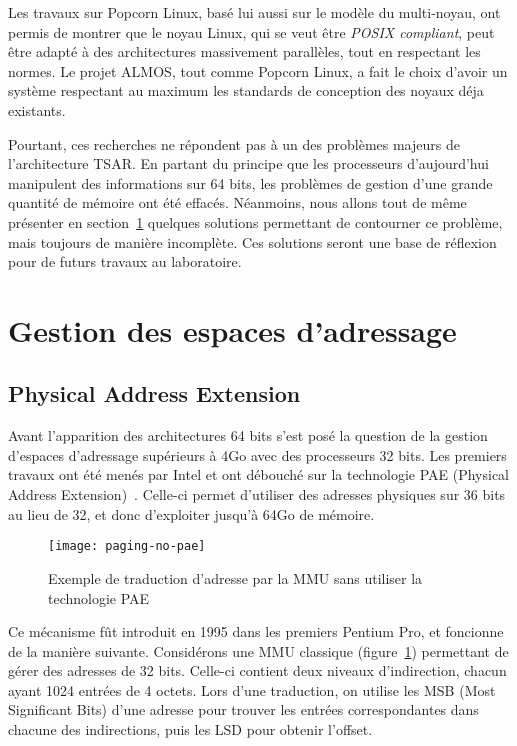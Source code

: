       Les travaux sur Popcorn Linux, basé lui aussi sur le modèle du
      multi-noyau, ont permis de montrer que le noyau Linux, qui se veut être
      \textit{POSIX compliant}, peut être adapté à des architectures massivement
      parallèles, tout en respectant les normes. Le projet ALMOS, tout comme
      Popcorn Linux, a fait le choix d'avoir un système respectant au maximum
      les standards de conception des noyaux déja existants.

      Pourtant, ces recherches ne répondent pas à un des problèmes majeurs de
      l'architecture TSAR. En partant du principe que les processeurs
      d'aujourd'hui manipulent des informations sur 64 bits, les problèmes de
      gestion d'une grande quantité de mémoire ont été effacés. Néanmoins, nous
      allons tout de même présenter en section~\ref{sec:memory} quelques
      solutions permettant de contourner ce problème, mais toujours de manière
      incomplète. Ces solutions seront une base de réflexion pour de futurs
      travaux au laboratoire.
    
     

  \section{Gestion des espaces d'adressage}
  \label{sec:memory}    

    \subsection{Physical Address Extension}

      Avant l'apparition des architectures 64 bits s'est posé la question de la
      gestion d'espaces d'adressage supérieurs à 4Go avec des processeurs 32
      bits. Les premiers travaux ont été menés par Intel et ont débouché sur la
      technologie PAE (Physical Address
      Extension)~\citep{patent6349380}. Celle-ci permet d'utiliser des adresses
      physiques sur 36 bits au lieu de 32, et donc d'exploiter jusqu'à 64Go de
      mémoire.

      \begin{figure}[h]
        \centering \texttt{[image: paging-no-pae]}
        \caption{Exemple de traduction d'adresse par la MMU sans utiliser la
          technologie PAE}
        \label{fig:paging-no-pae}
        \end{figure}
      
      Ce mécanisme fût introduit en 1995 dans les premiers Pentium Pro, et
      foncionne de la manière suivante. Considérons une MMU classique
      (figure~\ref{fig:paging-no-pae}) permettant de gérer des adresses de 32
      bits. Celle-ci contient deux niveaux d'indirection, chacun ayant 1024
      entrées de 4 octets. Lors d'une traduction, on utilise les MSB (Most
      Significant Bits) d'une adresse pour trouver les entrées correspondantes
      dans chacune des indirections, puis les LSD pour obtenir l'offset.

